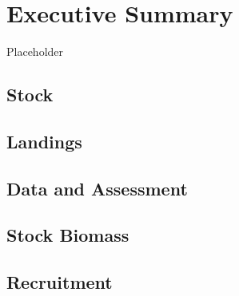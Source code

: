 \documentclass[11pt,
  english,
  a4paper,
]{article}
\begin{document}

\hypertarget{executive-summary-1}{%
\section*{Executive Summary}\label{executive-summary-1}}

\leavevmode\tagmcend\tagstructend

Placeholder


\hypertarget{stock-1}{%
\subsection*{Stock}\label{stock-1}}

\leavevmode\tagmcend\tagstructend


\hypertarget{landings-1}{%
\subsection*{Landings}\label{landings-1}}

\leavevmode\tagmcend\tagstructend


\hypertarget{data-and-assessment-1}{%
\subsection*{Data and Assessment}\label{data-and-assessment-1}}

\leavevmode\tagmcend\tagstructend


\hypertarget{stock-biomass-1}{%
\subsection*{Stock Biomass}\label{stock-biomass-1}}

\leavevmode\tagmcend\tagstructend


\hypertarget{recruitment-1}{%
\subsection*{Recruitment}\label{recruitment-1}}
\end{document}
